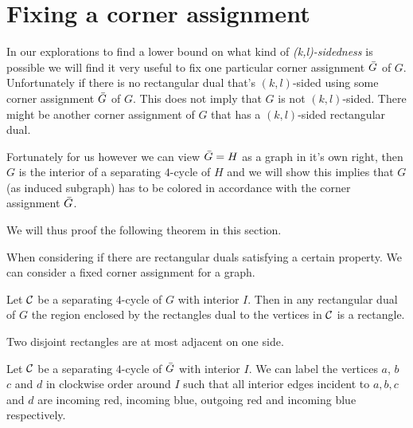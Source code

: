 

\section{Fixing a corner assignment}
  In our explorations to find a lower bound on what kind of \emph{(k,l)-sidedness} is possible we will find it very useful to fix one particular corner assignment $\bar{G}$ of $G$. Unfortunately if there is no rectangular dual that's $(k,l)$-sided using some corner assignment $\bar{G}$ of $G$. This does not imply that $G$ is not $(k,l)$-sided. There might be another corner assignment of $G$ that has a $(k,l)$-sided rectangular dual.

  Fortunately for us however we can view $\bar{G} = H$ as a graph in it's own right, then $G$ is the interior of a separating $4$-cycle of $H$ and we will show this implies that $G$ (as induced subgraph) has to be colored in accordance with the corner assignment $\bar{G}$.

  We will thus proof the following theorem in this section.
  \begin{thrm}
  \label{th:fixCorner assignment}
  When considering if there are rectangular duals satisfying a certain property. We can consider a fixed corner assignment for a graph.
  \end{thrm}

  \begin{remark}
  \label{re:interiorRectangle}
  Let $\mathcal{C}$ be a separating $4$-cycle of $G$ with interior $I$. Then in any rectangular dual of $G$ the region enclosed by the rectangles dual to the vertices in $\mathcal{C}$ is a rectangle.
  \end{remark}

  \begin{remark}
  \label{re:disjointRectanglesOnlyHaveOneAdjecentSide}
  Two disjoint rectangles are at most adjacent on one side.
  \end{remark}

  \begin{lemma}
  \label{lm:fix:fourCycleInteriorColor}
  Let $\mathcal{C}$ be a separating $4$-cycle of $\bar{G}$ with interior $I$. We can label the vertices $a$, $b$ $c$ and $d$ in clockwise order around $I$ such that all interior edges incident to $a, b, c$ and $d$ are incoming red, incoming blue, outgoing red and  incoming blue respectively.
  \end{lemma}

